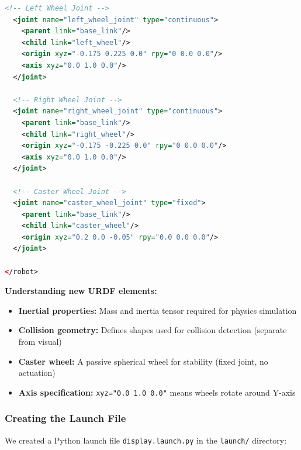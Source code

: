 \begin{lstlisting}[language=XML]
  <!-- Left Wheel Joint -->
  <joint name="left_wheel_joint" type="continuous">
    <parent link="base_link"/>
    <child link="left_wheel"/>
    <origin xyz="-0.175 0.225 0.0" rpy="0 0.0 0.0"/>  
    <axis xyz="0.0 1.0 0.0"/>
  </joint>
  
  <!-- Right Wheel Joint -->
  <joint name="right_wheel_joint" type="continuous">
    <parent link="base_link"/>
    <child link="right_wheel"/>
    <origin xyz="-0.175 -0.225 0.0" rpy="0 0.0 0.0"/>  
    <axis xyz="0.0 1.0 0.0"/>
  </joint>
  
  <!-- Caster Wheel Joint -->
  <joint name="caster_wheel_joint" type="fixed">
    <parent link="base_link"/>
    <child link="caster_wheel"/>
    <origin xyz="0.2 0.0 -0.05" rpy="0.0 0.0 0.0"/>
  </joint>

</robot>
\end{lstlisting}

\textbf{Understanding new URDF elements:}

\begin{itemize}
	\item \textbf{Inertial properties:} Mass and inertia tensor required for physics simulation
	\item \textbf{Collision geometry:} Defines shapes used for collision detection (separate from visual)
	\item \textbf{Caster wheel:} A passive spherical wheel for stability (fixed joint, no actuation)
	\item \textbf{Axis specification:} \texttt{xyz="0.0 1.0 0.0"} means wheels rotate around Y-axis
\end{itemize}

\subsubsection{Creating the Launch File}

We created a Python launch file \texttt{display.launch.py} in the \texttt{launch/} directory:

